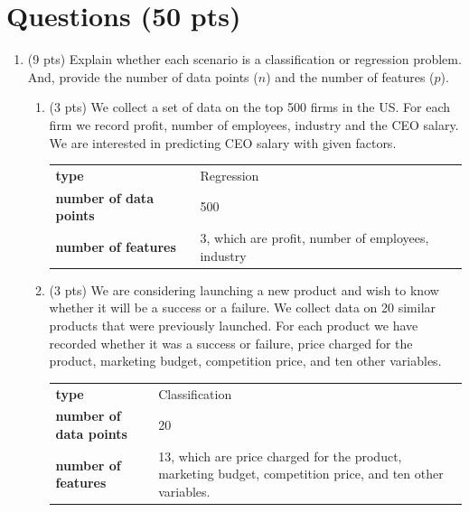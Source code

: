 \documentclass[a4paper]{article}
\theoremstyle{definition}
\newenvironment{soln}{
    \leavevmode\color{blue}\ignorespaces
}{}
\begin{document}
\section{Questions (50 pts)}
\begin{enumerate}
	\item (9 pts) Explain whether each scenario is a classification or regression problem. And, provide the number of data points ($n$) and the number of features ($p$).

	      \begin{enumerate}
		      \item (3 pts) We collect a set of data on the top 500 firms in the US. For each firm we record profit, number of employees, industry and the CEO salary. We are interested in predicting CEO salary with given factors.

		            \begin{soln}
			            \begin{tabular}{l p{}}
				            \textbf{type}                  & Regression                                         \\
				            \textbf{number of data points} & 500                                                \\
				            \textbf{number of features}    & 3, which are profit, number of employees, industry
			            \end{tabular}
		            \end{soln}

		      \item (3 pts) We are considering launching a new product and wish to know whether it will be a success or a failure. We collect data on 20 similar products that were previously launched. For each product we have recorded whether it was a success or failure, price charged for the product, marketing budget, competition price, and ten other variables.

		            \begin{soln}
			            \begin{tabular}{l p{}}
				            \textbf{type}                  & Classification                                                                                             \\
				            \textbf{number of data points} & 20                                                                                                         \\
				            \textbf{number of features}    & 13, which are price charged for the product, marketing budget, competition price, and ten other variables.
			            \end{tabular}
		            \end{soln}


\end{enumerate}
\end{enumerate}
\end{document}
